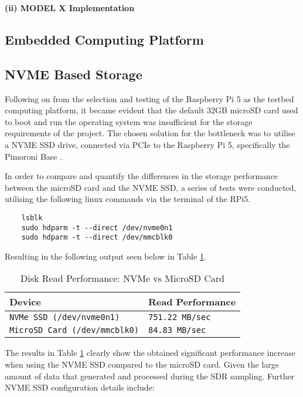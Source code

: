 \vspace{0.5cm} \noindent 
\textbf{(ii) MODEL X Implementation}



\subsection{Embedded Computing Platform \label{sec:embedded computing}}


\subsection{NVME Based Storage \label{sec:storage}}
Following on from the selection and testing of the Raspberry Pi 5 as the testbed computing platform, it became evident that the default 32GB microSD card used to boot and run the operating system was insufficient for the storage requirements of the project. The chosen solution for the bottleneck was to utilise a NVME SSD drive, connected via PCIe to the Raspberry Pi 5, specifically the Pimoroni Base \cite{pimoroni_nvme_base}.

In order to compare and quantify the differences in the storage performance between the microSD card and the NVME SSD, a series of tests were conducted, utilising the following linux commands via the terminal of the RPi5.

\begin{verbatim}
    lsblk
    sudo hdparm -t --direct /dev/nvme0n1 
    sudo hdparm -t --direct /dev/mmcblk0
\end{verbatim}

\noindent Resulting in the following output seen below in Table \ref{tab:diskperf}.

\begin{table}[h!]
    \centering
    \caption{Disk Read Performance: NVMe vs MicroSD Card \label{tab:diskperf}}
    \begin{tabular}{|l|l|}
    \hline
    \textbf{Device} & \textbf{Read Performance} \\ \hline
    \texttt{NVMe SSD (\texttt{/dev/nvme0n1})} & \texttt{751.22 MB/sec} \\ \hline
    \texttt{MicroSD Card (\texttt{/dev/mmcblk0})} & \texttt{84.83 MB/sec} \\ \hline
    \end{tabular}
\end{table}

The results in Table \ref{tab:diskperf} clearly show the obtained significant performance increase when using the NVME SSD compared to the microSD card. Given the large amount of data that generated and processed during the SDR sampling. Further NVME SSD configuration details include: 

